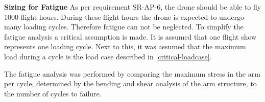 


\textbf{Sizing for Fatigue} \newline
As per requirement SR-AP-6, the drone should be able to fly 1000 flight hours. During these flight hours the drone is expected to undergo many loading cycles. Therefore fatigue can not be neglected. To simplify the fatigue analysis a critical assumption is made. It is assumed that one flight show represents one loading cycle. Next to this, it was assumed that the maximum load during a cycle is the load case described in \autoref{critical-loadcase}. 


The fatigue analysis was performed by comparing the maximum stress in the arm per cycle, determined by the bending and shear analysis of the arm structure, to the number of cycles to failure. 





